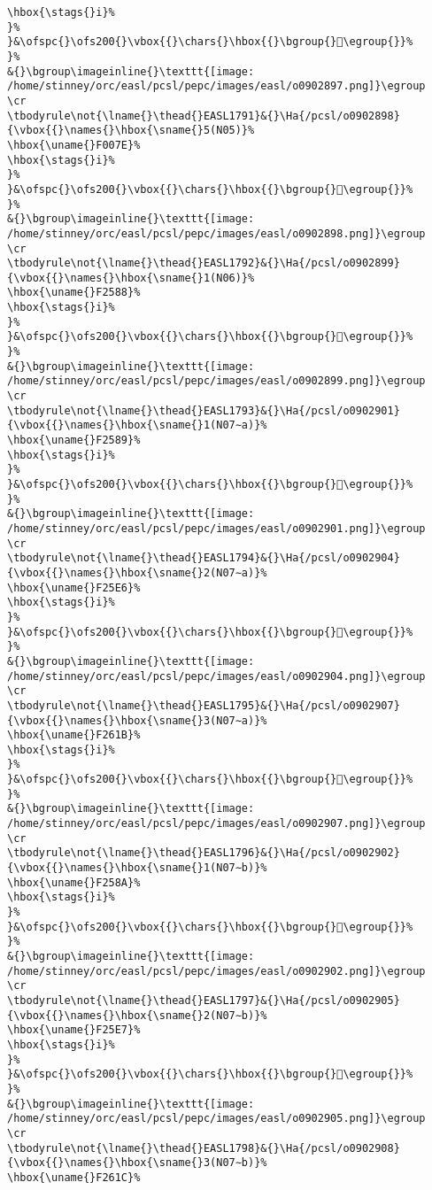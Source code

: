 \begin{verbatim}
\hbox{\stags{}i}%
}%
}&\ofspc{}\ofs200{}\vbox{{}\chars{}\hbox{{}\bgroup{}󲙇\egroup{}}%
}%
&{}\bgroup\imageinline{}\texttt{[image: /home/stinney/orc/easl/pcsl/pepc/images/easl/o0902897.png]}\egroup
\cr
\tbodyrule\not{\lname{}\thead{}EASL1791}&{}\Ha{/pcsl/o0902898}{\vbox{{}\names{}\hbox{\sname{}5(N05)}%
\hbox{\uname{}F007E}%
\hbox{\stags{}i}%
}%
}&\ofspc{}\ofs200{}\vbox{{}\chars{}\hbox{{}\bgroup{}󰁾\egroup{}}%
}%
&{}\bgroup\imageinline{}\texttt{[image: /home/stinney/orc/easl/pcsl/pepc/images/easl/o0902898.png]}\egroup
\cr
\tbodyrule\not{\lname{}\thead{}EASL1792}&{}\Ha{/pcsl/o0902899}{\vbox{{}\names{}\hbox{\sname{}1(N06)}%
\hbox{\uname{}F2588}%
\hbox{\stags{}i}%
}%
}&\ofspc{}\ofs200{}\vbox{{}\chars{}\hbox{{}\bgroup{}󲖈\egroup{}}%
}%
&{}\bgroup\imageinline{}\texttt{[image: /home/stinney/orc/easl/pcsl/pepc/images/easl/o0902899.png]}\egroup
\cr
\tbodyrule\not{\lname{}\thead{}EASL1793}&{}\Ha{/pcsl/o0902901}{\vbox{{}\names{}\hbox{\sname{}1(N07∼a)}%
\hbox{\uname{}F2589}%
\hbox{\stags{}i}%
}%
}&\ofspc{}\ofs200{}\vbox{{}\chars{}\hbox{{}\bgroup{}󲖉\egroup{}}%
}%
&{}\bgroup\imageinline{}\texttt{[image: /home/stinney/orc/easl/pcsl/pepc/images/easl/o0902901.png]}\egroup
\cr
\tbodyrule\not{\lname{}\thead{}EASL1794}&{}\Ha{/pcsl/o0902904}{\vbox{{}\names{}\hbox{\sname{}2(N07∼a)}%
\hbox{\uname{}F25E6}%
\hbox{\stags{}i}%
}%
}&\ofspc{}\ofs200{}\vbox{{}\chars{}\hbox{{}\bgroup{}󲗦\egroup{}}%
}%
&{}\bgroup\imageinline{}\texttt{[image: /home/stinney/orc/easl/pcsl/pepc/images/easl/o0902904.png]}\egroup
\cr
\tbodyrule\not{\lname{}\thead{}EASL1795}&{}\Ha{/pcsl/o0902907}{\vbox{{}\names{}\hbox{\sname{}3(N07∼a)}%
\hbox{\uname{}F261B}%
\hbox{\stags{}i}%
}%
}&\ofspc{}\ofs200{}\vbox{{}\chars{}\hbox{{}\bgroup{}󲘛\egroup{}}%
}%
&{}\bgroup\imageinline{}\texttt{[image: /home/stinney/orc/easl/pcsl/pepc/images/easl/o0902907.png]}\egroup
\cr
\tbodyrule\not{\lname{}\thead{}EASL1796}&{}\Ha{/pcsl/o0902902}{\vbox{{}\names{}\hbox{\sname{}1(N07∼b)}%
\hbox{\uname{}F258A}%
\hbox{\stags{}i}%
}%
}&\ofspc{}\ofs200{}\vbox{{}\chars{}\hbox{{}\bgroup{}󲖊\egroup{}}%
}%
&{}\bgroup\imageinline{}\texttt{[image: /home/stinney/orc/easl/pcsl/pepc/images/easl/o0902902.png]}\egroup
\cr
\tbodyrule\not{\lname{}\thead{}EASL1797}&{}\Ha{/pcsl/o0902905}{\vbox{{}\names{}\hbox{\sname{}2(N07∼b)}%
\hbox{\uname{}F25E7}%
\hbox{\stags{}i}%
}%
}&\ofspc{}\ofs200{}\vbox{{}\chars{}\hbox{{}\bgroup{}󲗧\egroup{}}%
}%
&{}\bgroup\imageinline{}\texttt{[image: /home/stinney/orc/easl/pcsl/pepc/images/easl/o0902905.png]}\egroup
\cr
\tbodyrule\not{\lname{}\thead{}EASL1798}&{}\Ha{/pcsl/o0902908}{\vbox{{}\names{}\hbox{\sname{}3(N07∼b)}%
\hbox{\uname{}F261C}%

\end{verbatim}
